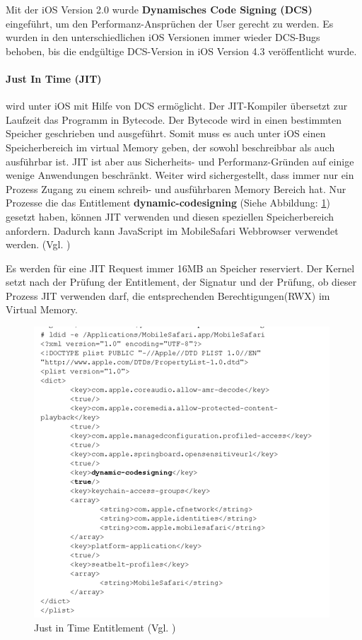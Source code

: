 Mit der iOS Version 2.0 wurde \textbf{Dynamisches Code Signing (DCS)} eingeführt, um den Performanz-Ansprüchen der User gerecht zu werden. Es wurden in den unterschiedlichen iOS Versionen immer wieder DCS-Bugs behoben, bis die endgültige DCS-Version in iOS Version 4.3 veröffentlicht wurde. 
\paragraph{Just In Time (JIT)} wird unter iOS mit Hilfe von DCS ermöglicht. Der JIT-Kompiler übersetzt zur Laufzeit das Programm in Bytecode. Der Bytecode wird in einen bestimmten Speicher geschrieben und ausgeführt. Somit muss es auch unter iOS einen Speicherbereich im virtual Memory geben, der sowohl beschreibbar als auch ausführbar ist.  JIT ist aber aus Sicherheits- und Performanz-Gründen auf einige wenige Anwendungen beschränkt. Weiter wird sichergestellt, dass immer nur ein Prozess Zugang zu einem schreib- und ausführbaren Memory Bereich hat. Nur Prozesse die das Entitlement \textbf{dynamic-codesigning} (Siehe Abbildung: \ref{fig:JIT}) gesetzt haben, können JIT verwenden und diesen speziellen Speicherbereich anfordern. Dadurch kann JavaScript im MobileSafari Webbrowser verwendet werden. (Vgl. \cite{JIT[1], ASLR[4]})

Es werden für eine JIT Request immer 16MB an Speicher reserviert. Der Kernel setzt nach der Prüfung der Entitlement, der Signatur und der Prüfung, ob dieser Prozess JIT verwenden darf, die entsprechenden Berechtigungen(RWX) im Virtual Memory.

\begin{figure}[htp!]
        \centering
                \includegraphics[scale=0.8]{JIT}
        \caption{Just in Time Entitlement (Vgl. \cite{Hacking[1]}) }
        \label{fig:JIT}
\end{figure}
